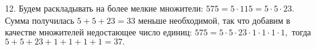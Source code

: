 12. Будем раскладывать на более мелкие множители: $575=5\cdot115=5\cdot5\cdot23.$ Сумма получилась $5+5+23=33$ меньше необходимой, так что добавим в качестве множителей недостающее число единиц: $575=5\cdot5\cdot23\cdot1\cdot1\cdot1\cdot1,$ тогда $5+5+23+1+1+1+1=37.$\\

